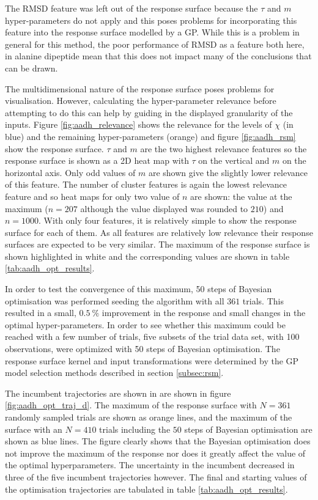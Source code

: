 The RMSD feature was left out of the response surface because the $\tau$ and $m$ hyper-parameters do not apply and this poses problems for incorporating this feature into the response surface modelled by a GP.  While this is a problem in general for this method, the poor performance of RMSD as a feature both here, in alanine dipeptide mean that this does not impact many of the conclusions that can be drawn. 

The multidimensional nature of the response surface poses problems for visualisation. However, calculating the hyper-parameter relevance before attempting to do this can help by guiding in the displayed granularity of the inputs. Figure \ref{fig:aadh_relevance} shows the relevance for the levels of $\chi$ (in blue) and the remaining hyper-parameters (orange) and figure \ref{fig:aadh_rsm} show the response surface. $\tau$ and $m$ are the two highest relevance features so the response surface is shown as a 2D heat map with $\tau$ on the vertical and $m$ on the horizontal axis. Only odd values of $m$ are shown give the slightly lower relevance of this feature. The number of cluster features is again the lowest relevance feature and so heat maps for only two value of $n$ are shown: the value at the maximum ($n=207$ although the value displayed was rounded to $210$) and $n=1000$. With only four features, it is relatively simple to show the response surface for each of them. As all features are relatively low relevance their response surfaces are expected to be very similar. The maximum of the response surface is shown highlighted in white and the corresponding values are shown in table \ref{tab:aadh_opt_results}. 

In order to test the convergence of this maximum, 50 steps of Bayesian optimisation was performed seeding the algorithm with all $361$ trials. This resulted in a small, $\SI{0.5}{\percent}$ improvement in the response and small changes in the optimal hyper-parameters.  In order to see whether this maximum could be reached with a few number of trials, five subsets of the trial data set, with 100 observations, were optimized with 50 steps of Bayesian optimisation. The response surface kernel and input transformations were determined by the GP model selection methods described in section \ref{subsec:rsm}. 

The incumbent trajectories are shown in are shown in figure \ref{fig:aadh_opt_traj_d}. The maximum of the response surface with $N=361$ randomly sampled trials are shown as orange lines, and the maximum of the surface with an $N=410$ trials including the $50$ steps of Bayesian optimisation are shown as blue lines.  The figure clearly shows that the Bayesian optimisation does not improve the maximum of the response nor does it greatly affect the value of the optimal hyperparameters. The uncertainty in the incumbent decreased in three of the five incumbent trajectories however.  The final and starting values of the optimisation trajectories are tabulated in table \ref{tab:aadh_opt_results}. 

